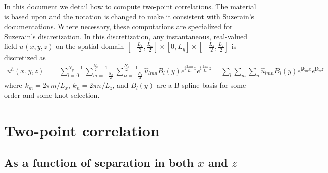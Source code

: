 \documentclass[letterpaper,11pt,nointlimits,reqno]{amsart}
\newcommand{\ii}{\ensuremath{\mathrm{i}}}
\begin{document}
In this document we detail how to compute two-point correlations.  The material
is based upon \citet[\textsection{}6.4--5]{Pope2000Turbulent} and the notation
is changed to make it consistent with Suzerain's documentations.  Where
necessary, these computations are specialized for Suzerain's discretization.  In
this discretization, any instantaneous, real-valued field
$u\!\left(x,y,z\right)$ on the spatial domain
$\left[-\frac{L_x}{2},\frac{L_x}{2}\right] \times{} [0,L_y] \times{}
\left[-\frac{L_z}{2},\frac{L_z}{2}\right]$ is discretized as
\begin{align}
  u^h(x,y,z)
&=
  \sum_{l=0}^{N_y - 1}
  \sum_{m=-\frac{N_x}{2}}^{\frac{N_x}{2}-1}
  \sum_{n=-\frac{N_z}{2}}^{\frac{N_z}{2}-1}
  \hat{u}_{l m n}
  B_l\!\left(y\right)
  e^{\ii\frac{2\pi{}m}{L_x}x}
  e^{\ii\frac{2\pi{}n}{L_z}z}
=
  \sum_{l}\sum_{m}\sum_{n}
  \hat{u}_{l m n}B_l\!\left(y\right)e^{\ii k_m x}e^{\ii k_n z}
\end{align}
where $k_m = 2\pi{}m/L_x$, $k_n = 2\pi{}n/L_z$, and $B_l\!\left(y\right)$ are a
B-spline basis for some order and some knot selection.

\section{Two-point correlation
         \citep[\textsection{}6.3]{Pope2000Turbulent}}

\subsection{As a function of separation in both $x$ and $z$}
\end{document}
